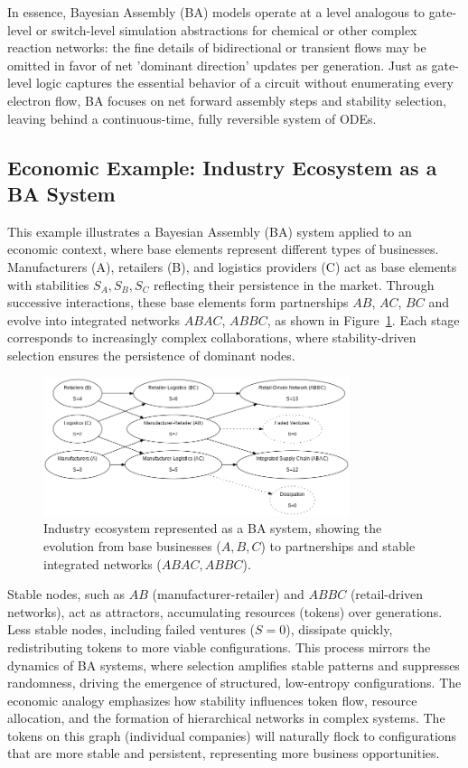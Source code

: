 \documentclass[entropy,article,submit,pdftex,moreauthors]{Definitions/mdpi}
\begin{document}
In essence, Bayesian Assembly (BA) models operate at a level analogous to gate-level or switch-level simulation abstractions for chemical or other complex reaction networks: the fine details of bidirectional or transient flows may be omitted in favor of net 'dominant direction' updates per generation. Just as gate-level logic captures the essential behavior of a circuit without enumerating every electron flow, BA focuses on net forward assembly steps and stability selection, leaving behind a continuous-time, fully reversible system of ODEs. 

\subsection{Economic Example: Industry Ecosystem as a BA System}

This example illustrates a Bayesian Assembly (BA) system applied to an economic context, where base elements represent different types of businesses. Manufacturers (A), retailers (B), and logistics providers (C) act as base elements with stabilities \( S_A, S_B, S_C \) reflecting their persistence in the market. Through successive interactions, these base elements form partnerships \( AB \), \( AC \), \( BC \) and evolve into integrated networks \( ABAC \), \( ABBC \), as shown in Figure~\ref{fig:ba_economic}. Each stage corresponds to increasingly complex collaborations, where stability-driven selection ensures the persistence of dominant nodes. 

\begin{figure}[h]
    \centering
    \includegraphics[width=0.8\textwidth]{abc_eco.png}
    \caption{Industry ecosystem represented as a BA system, showing the evolution from base businesses (\( A, B, C \)) to partnerships and stable integrated networks (\( ABAC, ABBC \)).}
    \label{fig:ba_economic}
\end{figure}

Stable nodes, such as \( AB \) (manufacturer-retailer) and \( ABBC \) (retail-driven networks), act as attractors, accumulating resources (tokens) over generations. Less stable nodes, including failed ventures (\( S=0 \)), dissipate quickly, redistributing tokens to more viable configurations. This process mirrors the dynamics of BA systems, where selection amplifies stable patterns and suppresses randomness, driving the emergence of structured, low-entropy configurations. The economic analogy emphasizes how stability influences token flow, resource allocation, and the formation of hierarchical networks in complex systems. The tokens on this graph (individual companies) will naturally flock to configurations that are more stable and persistent, representing more business opportunities.
\end{document}
